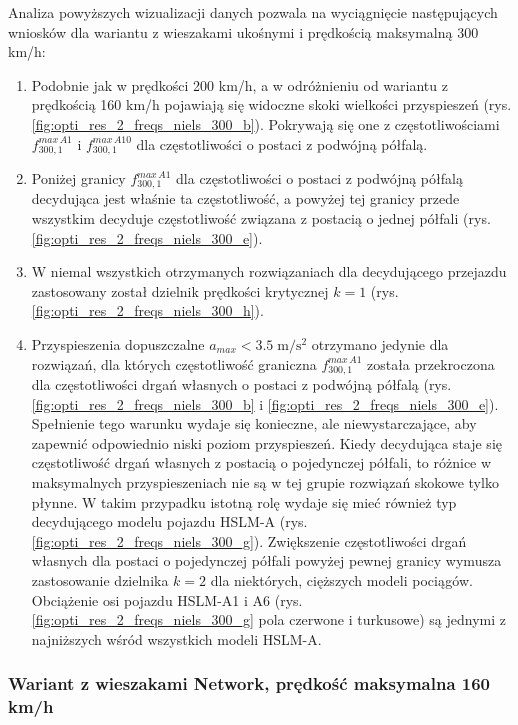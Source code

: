 Analiza powyższych wizualizacji danych pozwala na wyciągnięcie następujących wniosków dla wariantu z wieszakami ukośnymi i prędkością maksymalną 300 km/h:
\begin{enumerate}
	
	\item Podobnie jak w prędkości 200 km/h, a w odróżnieniu od wariantu z prędkością 160 km/h pojawiają się widoczne skoki wielkości przyspieszeń (rys. \ref{fig:opti_res_2_freqs_niels_300_b}). Pokrywają się one z częstotliwościami $f_{300,1}^{max\,A1}$ i $f_{300,1}^{max\,A10}$ dla częstotliwości o postaci z podwójną półfalą.
	
	\item Poniżej granicy $f_{300,1}^{max\,A1}$ dla częstotliwości o postaci z podwójną półfalą decydująca jest właśnie ta częstotliwość, a powyżej tej granicy przede wszystkim decyduje częstotliwość związana z postacią o jednej półfali (rys. \ref{fig:opti_res_2_freqs_niels_300_e}).
	
	\item W niemal wszystkich otrzymanych rozwiązaniach dla decydującego przejazdu zastosowany został dzielnik prędkości krytycznej $k=1$  (rys. \ref{fig:opti_res_2_freqs_niels_300_h}). 
	
	\item Przyspieszenia dopuszczalne $a_{max}<3.5\;\mathrm{m/s^2}$ otrzymano jedynie dla rozwiązań, dla których częstotliwość graniczna $f_{300,1}^{max\,A1}$ została przekroczona dla częstotliwości drgań własnych o postaci z podwójną półfalą (rys. \ref{fig:opti_res_2_freqs_niels_300_b} i \ref{fig:opti_res_2_freqs_niels_300_e}). Spełnienie tego warunku wydaje się konieczne, ale niewystarczające, aby zapewnić odpowiednio niski poziom przyspieszeń. Kiedy decydująca staje się częstotliwość drgań własnych z postacią o pojedynczej półfali, to różnice w maksymalnych przyspieszeniach nie są w tej grupie rozwiązań skokowe tylko płynne. W takim przypadku istotną rolę wydaje się mieć również typ decydującego modelu pojazdu HSLM-A (rys. \ref{fig:opti_res_2_freqs_niels_300_g}). Zwiększenie częstotliwości drgań własnych dla postaci o pojedynczej półfali powyżej pewnej granicy wymusza zastosowanie dzielnika $k=2$ dla niektórych, cięższych modeli pociągów. Obciążenie osi pojazdu HSLM-A1 i A6 (rys. \ref{fig:opti_res_2_freqs_niels_300_g} pola czerwone i turkusowe) są jednymi z najniższych wśród wszystkich modeli HSLM-A.
	
\end{enumerate}

\clearpage
\subsubsection{Wariant z wieszakami Network, prędkość maksymalna 160 km/h}

